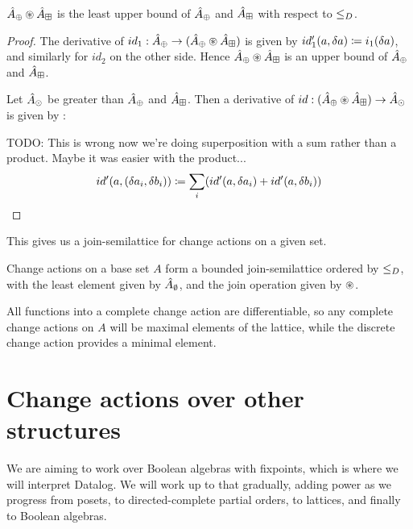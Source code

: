 \begin{corollary}
  $\hat{A}_\oplus \circledast \hat{A}_\boxplus$ is the least upper bound of $\hat{A}_\oplus$ and $\hat{A}_\boxplus$ with respect to $\leq_D$.
\end{corollary}
\ifproofs
\begin{proof}
  The derivative of $id_1: \hat{A}_\oplus \rightarrow (\hat{A}_\oplus \circledast
  \hat{A}_\boxplus)$ is given by $id_1'(a, \delta a) \coloneqq
  i_1(\delta a)$, and similarly for $id_2$ on the other side. Hence $\hat{A}_\oplus \circledast \hat{A}_\boxplus$
  is an upper bound of $\hat{A}_\oplus$ and $\hat{A}_\boxplus$.

  Let $\hat{A}_\odot$ be greater than $\hat{A}_\oplus$ and $\hat{A}_\boxplus$.
  Then a
  derivative of $id: (\hat{A}_\oplus \circledast \hat{A}_\boxplus) \rightarrow \hat{A}_\odot$ is
  given by :

  TODO: This is wrong now we're doing superposition with a sum rather than a
  product. Maybe it was easier with the product...
  $$
  id'(a, (\delta a_i, \delta b_i)) \coloneqq
    \sum_i (id'(a, \delta a_i) + id'(a, \delta b_i))
  $$
\end{proof}
\fi

This gives us a join-semilattice for change actions on a given set.

\begin{thm}
  Change actions on a base set $A$ form a bounded join-semilattice
  ordered by $\leq_D$, with the least element given by
  $\hat{A}_\emptyset$, and the join operation given by $\circledast$.
\end{thm}

All functions into a complete change action are differentiable, so any
complete change actions on $A$ will be maximal elements of the lattice, while
the discrete change action provides a minimal element.

\section{Change actions over other structures}
\label{sec:moreStructures}

We are aiming to work over Boolean algebras with fixpoints, which is where we
will interpret Datalog. We will work up to that gradually, adding power as we
progress from posets, to directed-complete partial orders, to lattices, and
finally to Boolean algebras.

